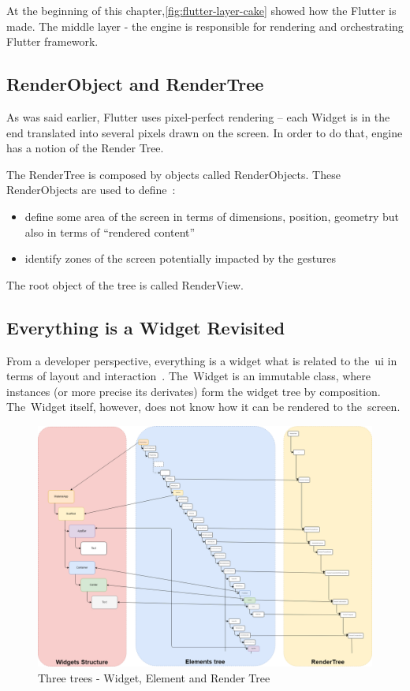 At the beginning of this chapter,\cref{fig:flutter-layer-cake} showed how the Flutter is made. The middle layer - the engine is responsible for rendering and orchestrating Flutter framework. 
\subsection{RenderObject and RenderTree}
As was said earlier, Flutter uses pixel-perfect rendering -- each Widget is in the end translated into several pixels drawn on the screen. In order to do that, engine has a notion of the Render Tree.

The RenderTree is composed by objects called RenderObjects. These RenderObjects are used to define~\cite{didier-internals}:
\begin{itemize}
    \item define some area of the screen in terms of dimensions, position, geometry but also in terms of ``rendered content''
    \item identify zones of the screen potentially impacted by the gestures
\end{itemize}
The root object of the tree is called RenderView.
\subsection{Everything is a Widget Revisited}
From a developer perspective, everything is a widget what is related to the~\gls{ui} in terms of layout and interaction~\cite{didier-internals}. The~Widget is an immutable class, where instances (or more precise its derivates) form the widget tree by composition. The~Widget itself, however, does not know how it can be rendered to the~screen. 

\begin{figure}[ht]
    \centering
    \includegraphics[width=0.75\linewidth]{img/flutter/internals_3_trees.png}
    \caption{Three trees - Widget, Element and Render Tree~\cite{didier-internals}}
    \label{fig:flutter-internal-3-trees}
\end{figure}


